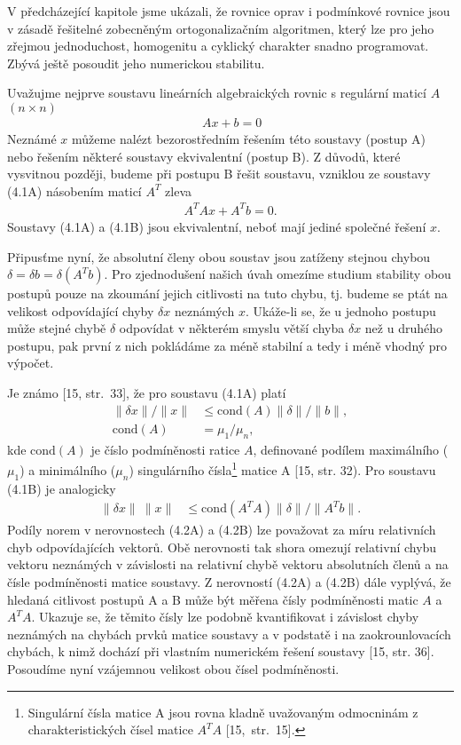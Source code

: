 
V předcházející kapitole  jsme ukázali, že rovnice oprav i
podmínkové rovnice jsou v zásadě řešitelné zobecněným
ortogonalizačním algoritmen, který lze pro jeho zřejmou jednoduchost,
homogenitu a cyklický charakter snadno programovat. Zbývá ještě
posoudit jeho numerickou stabilitu.

Uvažujme nejprve soustavu lineárních algebraických rovnic s
regulární maticí $A$ $(n \times n)$
%
\begin{align*}
  \tag{4.1A}\
  Ax + b = 0
\end{align*}
%
Neznámé $x$ můžeme nalézt bezorostředním řešením této soustavy
(postup A) nebo řešením některé soustavy ekvivalentní (postup
B). Z důvodů, které vysvitnou později, budeme při postupu B
řešit soustavu, vzniklou ze soustavy (4.1A) násobením maticí $A^T$
zleva
\begin{align*}
\tag{4.1B} A^TAx + A^Tb = 0.
\end{align*}
%
Soustavy (4.1A) a (4.1B) jsou ekvivalentní, neboť mají jediné
společné řešení $x$.



Připusťme nyní, že absolutní členy obou soustav jsou zatíženy stejnou
chybou $\delta = \delta b = \delta (A^Tb)$.  Pro zjednodušení našich
úvah omezíme studium stability obou postupů pouze na zkoumání jejich
citlivosti na tuto chybu, tj. budeme se ptát na velikost odpovídající
chyby $\delta x$ neznámých $x$. Ukáže-li se, že u jednoho postupu může
stejné chybě $\delta$ odpovídat v některém smyslu větší chyba $\delta
x$ než u druhého postupu, pak první z nich pokládáme za méně stabilní
a tedy i méně vhodný pro výpočet.




Je známo [15, str.~33], že pro soustavu (4.1A) platí
%
\begin{align*}
  \tag{4.2A} \|\delta x\| / \|x\| &\le \mathrm{cond}(A) \|\delta\|/\|b\|,\\
  \tag{4.3} \mathrm{cond}(A) &= \mu_1 / \mu_n,
\end{align*}
%
kde $\mathrm{cond}(A)$ je číslo podmíněnosti ratice $A$, definované podílem
%
%
maximálního  ($\mu_1$) a minimálního ($\mu_n$) singulárního
čísla\footnote{Singulární čísla matice A jsou rovna kladně uvažovaným
odmocninám z charakteristických čísel matice $A^TA$ [15,~str.~15].}
matice A [15, str. 32). Pro soustavu (4.1B) je analogicky
%
\begin{align*}
  \tag{4.2B} \|\delta x\| \ \|x\|
  & \le \mathrm{cond}(A^TA) \|\delta\|/\|A^Tb\|.
\end{align*}
%
Podíly norem v nerovnostech (4.2A) a (4.2B) lze považovat za
míru relativních chyb odpovídajících vektorů. Obě nerovnosti
tak shora omezují relativní chybu vektoru neznámých v závislosti
na relativní chybě vektoru absolutních členů a na čísle
podmíněnosti matice soustavy. Z nerovností (4.2A) a (4.2B) dále
vyplývá, že hledaná citlivost postupů A a B může být měřena
čísly podmíněnosti matic $A$ a $A^TA$. Ukazuje se, že těmito čísly
lze podobně kvantifikovat i závislost chyby neznámých na chybách
prvků matice soustavy a v podstatě i na zaokrounlovacích chybách,
k nimž dochází při vlastním numerickém řešení soustavy [15, str. 36].
Posoudíme nyní vzájemnou velikost obou čísel podmíněnosti.


